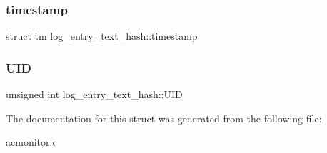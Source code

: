 \subsubsection{\texorpdfstring{timestamp}{timestamp}}
{\footnotesize\ttfamily struct tm log\+\_\+entry\+\_\+text\+\_\+hash\+::timestamp}

\mbox{\label{structlog__entry__text__hash_a68c5ad6594b98c96c933705d5d2b6167_a68c5ad6594b98c96c933705d5d2b6167}} 
\subsubsection{\texorpdfstring{U\+ID}{UID}}
{\footnotesize\ttfamily unsigned int log\+\_\+entry\+\_\+text\+\_\+hash\+::\+U\+ID}



The documentation for this struct was generated from the following file\+:\begin{DoxyCompactItemize}
\item 
\hyperlink{acmonitor_8c}{acmonitor.\+c}\end{DoxyCompactItemize}
